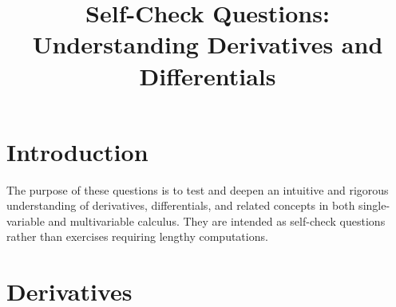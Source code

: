 \documentclass{essay}
\title{Self-Check Questions:\\Understanding Derivatives and Differentials}
\author{}
\date{}
\begin{document}
\maketitle

\section*{Introduction}

The purpose of these questions is to test and deepen an intuitive and rigorous understanding of derivatives, differentials, and related concepts in both single-variable and multivariable calculus. They are intended as self-check questions rather than exercises requiring lengthy computations.

\section{Derivatives}
\end{document}

